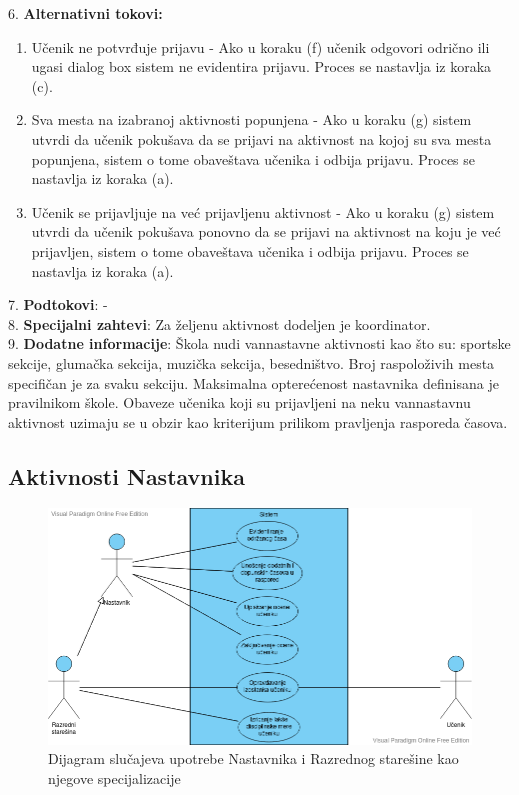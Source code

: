 \documentclass{article}
\begin{document}
6. \textbf{Alternativni tokovi:}
\begin{enumerate} [label=(\roman*)]
\item Učenik ne potvrđuje prijavu - Ako u koraku (f) učenik odgovori odrično ili ugasi dialog box sistem ne evidentira prijavu. Proces se nastavlja iz koraka (c). 
\item Sva mesta na izabranoj aktivnosti popunjena - Ako u koraku (g) sistem utvrdi da učenik pokušava da se prijavi na aktivnost na kojoj su sva mesta popunjena, sistem o tome obaveštava učenika i odbija prijavu. Proces se nastavlja iz koraka (a).
\item Učenik se prijavljuje na već prijavljenu aktivnost - Ako u koraku (g) sistem utvrdi da učenik pokušava ponovno da se prijavi na aktivnost na koju je već prijavljen, sistem o tome obaveštava učenika i odbija prijavu. Proces se nastavlja iz koraka (a).

\end{enumerate}

7. \textbf{Podtokovi}: - \\

8. \textbf{Specijalni zahtevi}: Za željenu aktivnost dodeljen je koordinator. \\

9. \textbf{Dodatne informacije}: Škola nudi vannastavne aktivnosti kao što su: sportske sekcije, glumačka sekcija, muzička sekcija, besedništvo. Broj raspoloživih mesta specifičan je za svaku sekciju. Maksimalna opterećenost nastavnika definisana je pravilnikom škole. Obaveze učenika koji su prijavljeni na neku vannastavnu aktivnost uzimaju se u obzir kao kriterijum prilikom pravljenja rasporeda časova. \\

\newpage
\subsection{Aktivnosti Nastavnika}

\begin{figure} [!ht]
    \begin{center}
        \includegraphics[scale=0.45]{imgs/nastavnik_use_case.png}
    \end{center}
\caption{Dijagram slučajeva upotrebe Nastavnika i Razrednog starešine kao njegove specijalizacije}
\end{figure}
\end{document}
